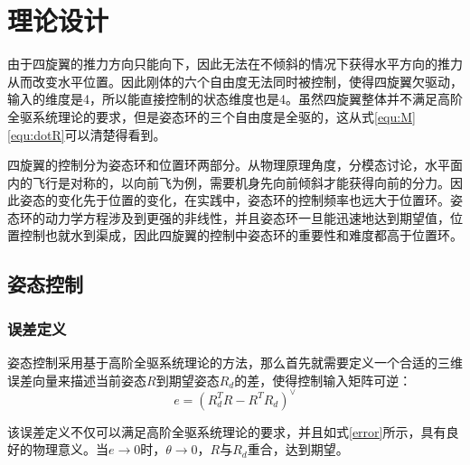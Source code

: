 \chapter{理论设计}  
由于四旋翼的推力方向只能向下，因此无法在不倾斜的情况下获得水平方向的推力从而改变水平位置。因此刚体的六个自由度无法同时被控制，使得四旋翼欠驱动，输入的维度是4，所以能直接控制的状态维度也是4。虽然四旋翼整体并不满足高阶全驱系统理论的要求，但是姿态环的三个自由度是全驱的，这从式\ref{equ:M}\ref{equ:dotR}可以清楚得看到。

四旋翼的控制分为姿态环和位置环两部分。从物理原理角度，分模态讨论，水平面内的飞行是对称的，以向前飞为例，需要机身先向前倾斜才能获得向前的分力。因此姿态的变化先于位置的变化，在实践中，姿态环的控制频率也远大于位置环。姿态环的动力学方程涉及到更强的非线性，并且姿态环一旦能迅速地达到期望值，位置控制也就水到渠成，因此四旋翼的控制中姿态环的重要性和难度都高于位置环。

\section{姿态控制}

\subsection*{误差定义}
姿态控制采用基于高阶全驱系统理论的方法，那么首先就需要定义一个合适的三维误差向量来描述当前姿态$R$到期望姿态$R_d$的差，使得控制输入矩阵可逆：
\begin{equation}
    e=(R_d^TR-R^TR_d)^\vee
\end{equation}

该误差定义不仅可以满足高阶全驱系统理论的要求，并且如式\ref{error}所示，具有良好的物理意义。当$e\to 0$时，$\theta \to 0$，$R$与$R_d$重合，达到期望。

